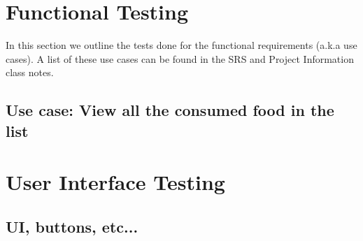 \documentclass{scrreprt}
\begin{document}
    \section{Functional Testing}

	In this section we outline the tests done for the functional requirements (a.k.a use cases). A list of these use cases can be found in the SRS and Project 			Information class notes.
	
	\subsection{Use case: View all the consumed food in the list}


    \section{User Interface Testing}

    \subsection{UI, buttons, etc...}
\end{document}
